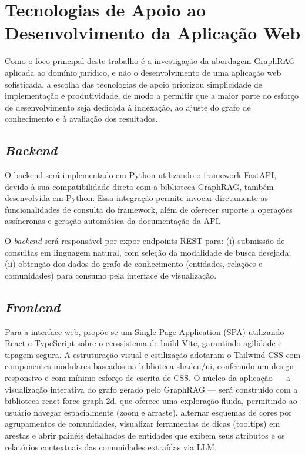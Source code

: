 \section{Tecnologias de Apoio ao Desenvolvimento da Aplicação Web}
\label{sec-fundteo-stack}

Como o foco principal deste trabalho é a investigação da abordagem GraphRAG
aplicada ao domínio jurídico, e não o desenvolvimento de uma aplicação web
sofisticada, a escolha das tecnologias de apoio priorizou simplicidade de
implementação e produtividade, de modo a permitir que a
maior parte do esforço de desenvolvimento seja dedicada à indexação, ao ajuste
do grafo de conhecimento e à avaliação dos resultados.

\subsection{\textit{Backend}}
\label{sec-fundteo-stack-backend}

O backend será implementado em Python utilizando o framework FastAPI,
devido à sua compatibilidade direta com a biblioteca GraphRAG, também
desenvolvida em Python. Essa integração permite invocar diretamente as
funcionalidades de consulta do framework, além de oferecer suporte a operações 
assíncronas e geração automática da documentação da API.

O \textit{backend} será responsável por expor endpoints REST para: (i)
submissão de consultas em linguagem natural, com seleção da modalidade de
busca desejada; (ii) obtenção dos dados do grafo de conhecimento (entidades,
relações e comunidades) para consumo pela interface de visualização.

\subsection{\textit{Frontend}}
\label{sec-fundteo-stack-frontend}

Para a interface web, propõe-se  um Single Page Application (SPA) utilizando React 
e TypeScript sobre o ecossistema de build Vite, garantindo agilidade e tipagem segura.
A estruturação visual e estilização adotaram o Tailwind CSS com componentes modulares 
baseados na biblioteca shadcn/ui, conferindo um design responsivo e com mínimo esforço de escrita de CSS.
O núcleo da aplicação — a visualização interativa do grafo gerado pelo GraphRAG — será construído com a biblioteca
react-force-graph-2d, que oferece uma exploração fluida, permitindo ao usuário navegar espacialmente (zoom e arraste),
alternar esquemas de cores por agrupamentos de comunidades, visualizar ferramentas de dicas (tooltips) em arestas e abrir
 painéis detalhados de entidades que exibem seus atributos e os relatórios contextuais das comunidades extraídas via LLM.

